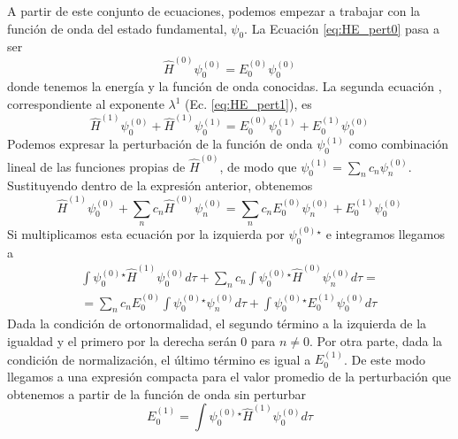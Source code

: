 \documentclass{tufte-handout}
\begin{document}
A partir de este conjunto de ecuaciones, podemos empezar a trabajar
con la función de onda del estado fundamental, $\psi_0$. La Ecuación
\ref{eq:HE_pert0} pasa a ser
\begin{equation}
    \hat{H}^{(0)}\psi_0^{(0)} = E_0^{(0)}\psi_0^{(0)}
\end{equation}
donde tenemos la energía y la función de onda conocidas. La segunda ecuación
, correspondiente al exponente $\lambda^1$ (Ec. \ref{eq:HE_pert1}), 
es 
\begin{equation}
    \hat{H}^{(1)}\psi_0^{(0)} + \hat{H}^{(1)}\psi_0^{(1)} = 
    E_0^{(0)}\psi_0^{(1)} + E_0^{(1)}\psi_0^{(0)}
\end{equation}
Podemos expresar la perturbación de la función de onda $\psi_0^{(1)}$ 
como combinación lineal de las funciones propias de $\hat{H}^{(0)}$,
de modo que $\psi_0^{(1)}=\sum_nc_n\psi_n^{(0)}$. Sustituyendo
dentro de la expresión anterior, obtenemos
\begin{equation}
    \hat{H}^{(1)}\psi_0^{(0)} + \sum_nc_n\hat{H}^{(0)}\psi_n^{(0)} = 
    \sum_nc_nE_0^{(0)}\psi_n^{(0)} + E_0^{(1)}\psi_0^{(0)}
\end{equation}
Si multiplicamos esta ecuación por la izquierda por $\psi_0^{(0)}^\star$
e integramos llegamos a
\begin{equation}
\begin{split}
  \int \psi_0^{(0)}^\star \hat{H}^{(1)}\psi_0^{(0)}d\tau +  \sum_nc_n\int \psi_0^{(0)}^\star\hat{H}^{(0)}\psi_n^{(0)}d\tau = \\
    = \sum_nc_nE_0^{(0)}\int \psi_0^{(0)}^\star\psi_n^{(0)}d\tau + \int \psi_0^{(0)}^\star E_0^{(1)}\psi_0^{(0)}d\tau
\end{split}
\end{equation}
Dada la condición de ortonormalidad, el segundo término a la izquierda de
la igualdad y el primero por la derecha serán $0$ para $n\neq 0$. Por otra
parte, dada la condición de normalización, el último término es igual a 
$E_0^{(1)}$. De este modo llegamos a una expresión compacta para el
valor promedio de la perturbación que obtenemos a partir de la función 
de onda sin perturbar
\begin{equation}
    E_0^{(1)}= \int \psi_0^{(0)}^\star \hat{H}^{(1)}\psi_0^{(0)}d\tau 
\end{equation}
\end{document}
